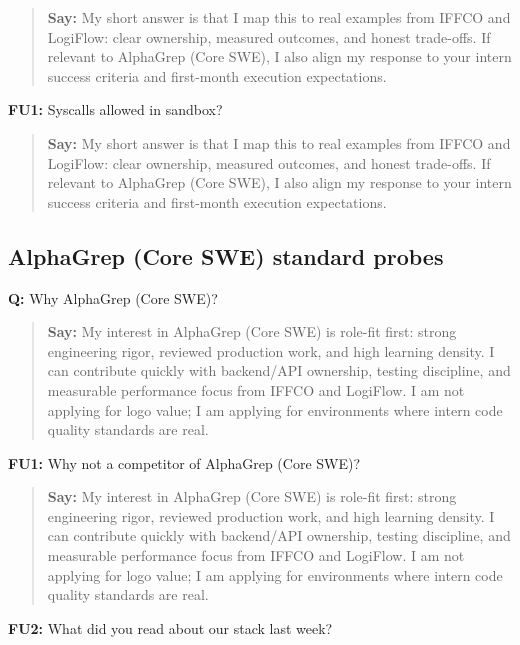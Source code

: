 \documentclass[9pt,a4paper]{article}
\begin{document}
\begin{quote}\small\textbf{Say:} My short answer is that I map this to real examples from IFFCO and LogiFlow: clear ownership, measured outcomes, and honest trade-offs. If relevant to AlphaGrep (Core SWE), I also align my response to your intern success criteria and first-month execution expectations.\end{quote}
\vspace{2mm}
\textbf{FU1:} Syscalls allowed in sandbox?

\begin{quote}\small\textbf{Say:} My short answer is that I map this to real examples from IFFCO and LogiFlow: clear ownership, measured outcomes, and honest trade-offs. If relevant to AlphaGrep (Core SWE), I also align my response to your intern success criteria and first-month execution expectations.\end{quote}
\vspace{2mm}
\subsection{AlphaGrep (Core SWE) standard probes}
\textbf{Q:} Why AlphaGrep (Core SWE)?

\begin{quote}\small\textbf{Say:} My interest in AlphaGrep (Core SWE) is role-fit first: strong engineering rigor, reviewed production work, and high learning density. I can contribute quickly with backend/API ownership, testing discipline, and measurable performance focus from IFFCO and LogiFlow. I am not applying for logo value; I am applying for environments where intern code quality standards are real.\end{quote}
\vspace{2mm}
\textbf{FU1:} Why not a competitor of AlphaGrep (Core SWE)?

\begin{quote}\small\textbf{Say:} My interest in AlphaGrep (Core SWE) is role-fit first: strong engineering rigor, reviewed production work, and high learning density. I can contribute quickly with backend/API ownership, testing discipline, and measurable performance focus from IFFCO and LogiFlow. I am not applying for logo value; I am applying for environments where intern code quality standards are real.\end{quote}
\vspace{2mm}
\textbf{FU2:} What did you read about our stack last week?
\end{document}
